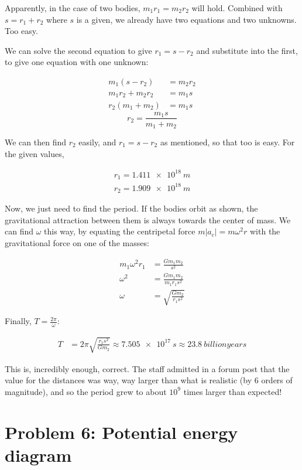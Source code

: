 \documentclass[8.01x]{subfiles}
\begin{document}
Apparently, in the case of two bodies, $m_1 r_1 = m_2 r_2$ will hold. Combined with $s = r_1 + r_2$ where $s$ is a given, we already have two equations and two unknowns. Too easy.

We can solve the second equation to give $r_1 = s - r_2$ and substitute into the first, to give one equation with one unknown:

\begin{align}
m_1 (s - r_2) &= m_2 r_2\\
m_1 r_2 +m_2 r_2 &= m_1 s\\
r_2(m_1 + m_2) &= m_1 s
\end{align}
\begin{equation}
r_2 = \frac{m_1 s}{m_1 + m_2}
\end{equation}

We can then find $r_2$ easily, and $r_1 = s - r_2$ as mentioned, so that too is easy. For the given values,

\begin{align}
r_1 = \SI{1.411e18}{m}\\
r_2 = \SI{1.909e18}{m}
\end{align}

Now, we just need to find the period. If the bodies orbit as shown, the gravitational attraction between them is always towards the center of mass. We can find $\omega$ this way, by equating the centripetal force $m |a_c| = m \omega^2 r$ with the gravitational force on one of the masses:

\begin{align}
m_1 \omega^2 r_1 &= \frac{G m_1 m_2}{s^2}\\
\omega^2 &= \frac{G m_1 m_2}{m_1 r_1 s^2}\\
\omega &= \sqrt{\frac{G m_2}{r_1 s^2}}
\end{align}

Finally, $\displaystyle T = \frac{2 \pi}{\omega}$:

\begin{align}
T &= 2 \pi \sqrt{\frac{r_1 s^2}{G m_2}} \approx \SI{7.505e17}{s} \approx \SI{23.8}{billion years}
\end{align}

This is, incredibly enough, correct. The staff admitted in a forum post that the value for the distances was way, way larger than what is realistic (by 6 orders of magnitude), and so the period grew to about $10^9$ times larger than expected!

\section{Problem 6: Potential energy diagram}
\end{document}
